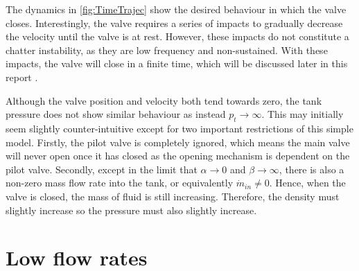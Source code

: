 The dynamics in \cref{fig:TimeTrajec} show the desired behaviour in which the valve closes. Interestingly, the valve requires a series of impacts to gradually decrease the velocity until the valve is at rest. However, these impacts do not constitute a chatter instability, as they are low frequency and non-sustained. With these impacts, the valve will close in a finite time, which will be discussed later in this report%
.

Although the valve position and velocity both tend towards zero, the tank pressure does not show similar behaviour as instead $p_t \rightarrow \infty$. This may initially seem slightly counter-intuitive except for two important restrictions of this simple model. Firstly, the pilot valve is completely ignored, which means the main valve will never open once it has closed as the opening mechanism is dependent on the pilot valve. Secondly, except in the limit that $\alpha \rightarrow 0$ and $\beta \rightarrow \infty$, there is also a non-zero mass flow rate into the tank, or equivalently $\dot{m}_{in} \neq 0$. Hence, when the valve is closed, the mass of fluid is still increasing. Therefore, the density must slightly increase so the pressure must also slightly increase.




\section{Low flow rates}

